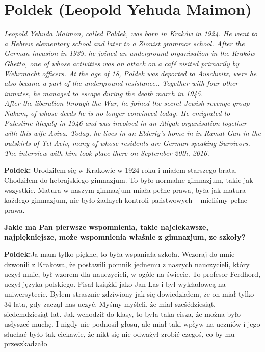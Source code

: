 \section{Poldek (Leopold Yehuda Maimon)}

\textit{Leopold Yehuda Maimon, called Poldek, was born in Kraków in 1924. He went to a Hebrew elementary school and later to a Zionist grammar school. After the German invasion in 1939, he joined an underground organisation in the Kraków Ghetto, one of whose activities was an attack on a café visited primarily by Wehrmacht officers. At the age of 18, Poldek was deported to Auschwitz, were he also became a part of the underground resistance.. Together with four other inmates, he managed to escape during the death march in 1945.\\
After the liberation through the War, he joined the secret Jewish revenge group Nakam, of whose deeds he is no longer convinced today. He emigrated to Palestine illegaly in 1946 and was involved in an Aliyah organisation together with this wife Aviva. Today, he lives in an Elderly’s home in in Ramat Gan in the outskirts of Tel Aviv, many of whose residents are German-speaking Survivors. The interview with him took place there on September 20th, 2016.}\par
\vspace*{2em}
\textbf{Poldek:} Urodziłem się w Krakowie w 1924 roku i miałem starszego brata. Chodziłem do hebrajskiego gimnazjum. To było normalne gimnazjum, takie jak wszystkie. Matura w naszym gimnazjum miała pełne prawa, była jak matura każdego gimnazjum, nie było żadnych kontroli państwowych – mieliśmy pełne prawa.\par
\textbf{Jakie ma Pan pierwsze wspomnienia, takie najciekawsze, najpiękniejsze, może wspomnienia właśnie z gimnazjum, ze szkoły?}\par
\textbf{Poldek:}Ja mam tylko piękne, to była wspaniała szkoła. Wczoraj do mnie dzwonili z Krakowa, że postawili pomnik jednemu z naszych nauczycieli, który uczył mnie, był wzorem dla nauczycieli, w ogóle na świecie. To profesor Ferdhord, uczył języka polskiego. Pisał książki jako Jan Las i był wykładowcą na uniwersytecie. Byłem strasznie zdziwiony jak się dowiedziałem, że on miał tylko 34 lata, gdy zaczął nas uczyć. Myśmy myśleli, że miał sześćdziesiąt, siedemdziesiąt lat. Jak wchodził do klasy, to była taka cisza, że można było usłyszeć muchę. I nigdy nie podnosił głosu, ale miał taki wpływ na uczniów i jego słuchać było tak ciekawie, że nikt się nie odważył zrobić czegoś, co by mu przeszkadzało\par
